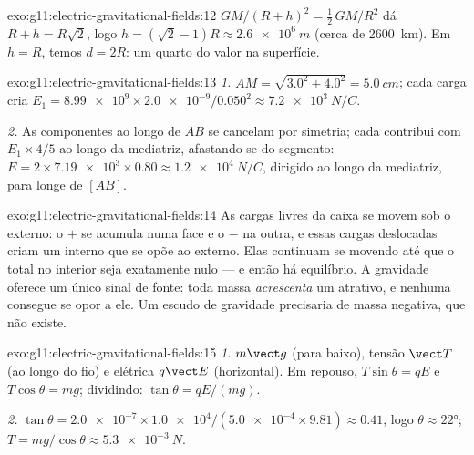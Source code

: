 \begin{solution}{exo:g11:electric-gravitational-fields:12}
$GM/(R+h)^2 = \tfrac12\,GM/R^2$ dá $R + h = R\sqrt{2}$, logo
$h = (\sqrt{2} - 1)R \approx \qty{2.6e6}{m}$ (cerca de \qty{2600}{km}).
Em $h = R$, temos $d = 2R$: um quarto do valor na superfície.
\end{solution}

\begin{solution}{exo:g11:electric-gravitational-fields:13}
\emph{1.} $AM = \sqrt{3.0^2 + 4.0^2} = \qty{5.0}{cm}$; cada carga cria
$E_1 = \num{8.99e9} \times \num{2.0e-9} / 0.050^2
\approx \qty{7.2e3}{N/C}$.

\emph{2.} As componentes ao longo de $AB$ se cancelam por simetria; cada
 contribui com $E_1 \times 4/5$ ao longo da mediatriz, afastando-se
do segmento: $E = 2 \times \num{7.19e3} \times 0.80 \approx
\qty{1.2e4}{N/C}$, dirigido ao longo da mediatriz, para longe de $[AB]$.
\end{solution}

\begin{solution}{exo:g11:electric-gravitational-fields:14}
As cargas livres da caixa se movem sob o  externo: o $+$ se acumula
numa face e o $-$ na outra, e essas cargas deslocadas criam um 
interno que se opõe ao externo. Elas continuam se movendo até que o 
total no interior seja exatamente nulo --- e então há equilíbrio. A
gravidade oferece um único sinal de fonte: toda massa \emph{acrescenta}
um  atrativo, e nenhuma consegue se opor a ele. Um escudo de
gravidade precisaria de massa negativa, que não existe.
\end{solution}

\begin{solution}{exo:g11:electric-gravitational-fields:15}
\emph{1.}  $m\vect g$ (para baixo), tensão $\vect T$ (ao longo do
fio) e  elétrica $q\vect E$ (horizontal). Em repouso,
$T\sin\theta = qE$ e $T\cos\theta = mg$; dividindo:
$\tan\theta = qE/(mg)$.

\emph{2.} $\tan\theta = \num{2.0e-7} \times \num{1.0e4} /
(\num{5.0e-4} \times 9.81) \approx 0.41$, logo
$\theta \approx \ang{22}$; $T = mg/\cos\theta \approx \qty{5.3e-3}{N}$.
\end{solution}


